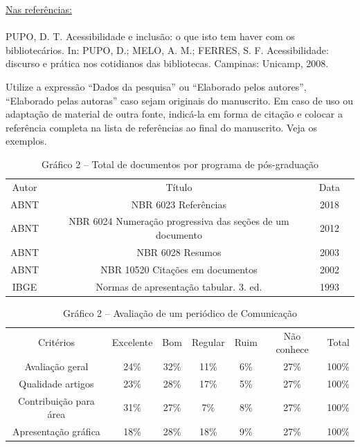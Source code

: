 \documentclass[12pt]{article}
\begin{document}

\underline{Nas referências:}\\ \\ 
PUPO, D. T. Acessibilidade e inclusão: o que isto tem haver com os bibliotecários. In: PUPO, D.; MELO, A. M.; FERRES, S. F. Acessibilidade: discurso e prática nos cotidianos das bibliotecas. Campinas: Unicamp, 2008.

Utilize a expressão “Dados da pesquisa” ou “Elaborado pelos autores”, “Elaborado pelas autoras” caso sejam originais do manuscrito. Em caso de uso ou adaptação de material de outra fonte, indicá-la em forma de citação e colocar a referência completa na lista de referências ao final do manuscrito. Veja os exemplos.

\begin{table}[H]
\centering
\caption{Gráfico 2 – Total de documentos por programa de pós-graduação } 
\begin{tabular}{|c|c|c|c|}
\cline{1-3}
 Autor & Título & Data \\ \cline{1-3}
 ABNT & NBR 6023 Referências  & 2018 \\ \cline{1-3}
 ABNT & NBR 6024 Numeração progressiva das seções de um documento & 2012 \\ \cline{1-3}
 ABNT & NBR 6028 Resumos & 2003 \\ \cline{1-3}
 ABNT & NBR 10520 Citações em documentos & 2002 \\ \cline{1-3}
 IBGE & Normas de apresentação tabular. 3. ed. & 1993 \\ \cline{1-3}
\end{tabular}
{\footnotesize{}} %
\end{table}

\begin{table}[H]
\centering
\caption{Gráfico 2 – Avaliação de um periódico de Comunicação } 
\begin{tabular}{c|c|c|c|c|c|c}
\cline{1-7}
Critérios & Excelente & Bom & Regular & Ruim & Não conhece & Total\\ \cline{1-7}
Avaliação geral & 24\% & 32\% & 11\% & 6\% & 27\% & 100\%\\ \cline{1-7}
Qualidade artigos & 23\% & 28\% & 17\% & 5\% & 27\% & 100\% \\ \cline{1-7}
Contribuição para área & 31\% & 27\% & 7\% & 8\% & 27\% & 100\%\\ \cline{1-7}
Apresentação gráfica & 18\% & 28\% & 18\% & 9\% & 27\% & 100\% \\ \cline{1-7}
\end{tabular}
{\footnotesize{}} %
\end{table}
\end{document}
